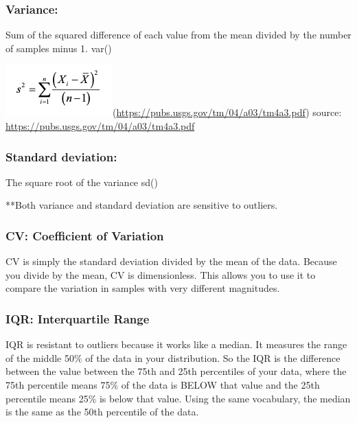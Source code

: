 \documentclass[
]{book}
\begin{document}
\hypertarget{variance}{%
\subsubsection{Variance:}\label{variance}}

Sum of the squared difference of each value from the mean divided by the number of samples minus 1. var()

\includegraphics{images/Screen Shot 2021-01-25 at 10.29.45 AM.png}(\url{https://pubs.usgs.gov/tm/04/a03/tm4a3.pdf}) source: \url{https://pubs.usgs.gov/tm/04/a03/tm4a3.pdf}

\hypertarget{standard-deviation}{%
\subsubsection{Standard deviation:}\label{standard-deviation}}

The square root of the variance sd()

**Both variance and standard deviation are sensitive to outliers.

\hypertarget{cv-coefficient-of-variation}{%
\subsubsection{CV: Coefficient of Variation}\label{cv-coefficient-of-variation}}

CV is simply the standard deviation divided by the mean of the data. Because you divide by the mean, CV is dimensionless. This allows you to use it to compare the variation in samples with very different magnitudes.

\hypertarget{iqr-interquartile-range}{%
\subsubsection{IQR: Interquartile Range}\label{iqr-interquartile-range}}

IQR is resistant to outliers because it works like a median. It measures the range of the middle 50\% of the data in your distribution. So the IQR is the difference between the value between the 75th and 25th percentiles of your data, where the 75th percentile means 75\% of the data is BELOW that value and the 25th percentile means 25\% is below that value. Using the same vocabulary, the median is the same as the 50th percentile of the data.
\end{document}

